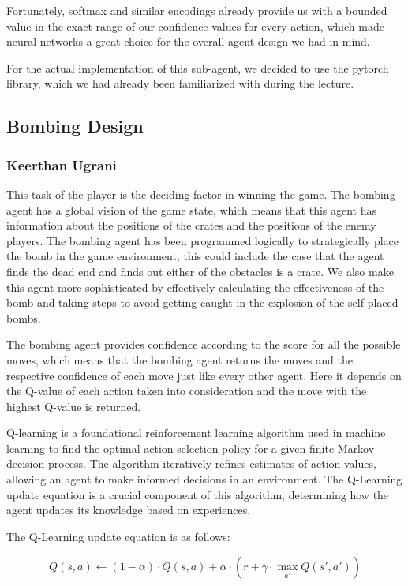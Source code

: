 Fortunately, softmax and similar encodings already provide us with a bounded value in the exact range of our confidence
values for every action, which made neural networks a great choice for the overall agent design we had in mind.

For the actual implementation of this sub-agent, we decided to use the pytorch library, which we had already been
familiarized with during the lecture.

\subsection{Bombing Design}
\subsubsection*{Keerthan Ugrani}
\label{subsec:survivor-design}
This task of the player is the deciding factor in winning the game. The bombing agent has a global vision of the game state, which means that this agent has information about the positions of the crates and the positions of the enemy players. The bombing agent has been programmed logically to strategically place the bomb in the game environment, this could include the case that the agent finds the dead end and finds out either of the obstacles is a crate. We also make this agent more sophisticated by effectively calculating the effectiveness of the bomb and taking steps to avoid getting caught in the explosion of the self-placed bombs. 

The bombing agent provides confidence according to the score for all the possible moves, which means that the bombing agent returns the moves and the respective confidence of each move just like every other agent. Here it depends on the Q-value of each action taken into consideration and the move with the highest Q-value is returned.

Q-learning is a foundational reinforcement learning algorithm used in machine learning to find the optimal action-selection policy for a given finite Markov decision process. The algorithm iteratively refines estimates of action values, allowing an agent to make informed decisions in an environment. The Q-Learning update equation is a crucial component of this algorithm, determining how the agent updates its knowledge based on experiences.

The Q-Learning update equation is as follows:

\[Q(s, a) \leftarrow (1 - \alpha) \cdot Q(s, a) + \alpha \cdot \left(r + \gamma \cdot \max_{a'} Q(s', a')\right)\]

